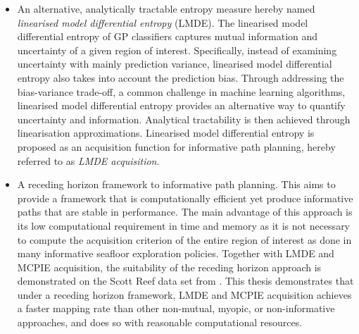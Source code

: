 \begin{itemize}
			\item An alternative, analytically tractable entropy measure hereby named \textit{linearised model differential entropy} (LMDE). The linearised model differential entropy of GP classifiers captures mutual information and uncertainty of a given region of interest. Specifically, instead of examining uncertainty with mainly prediction variance, linearised model differential entropy also takes into account the prediction bias. Through addressing the bias-variance trade-off, a common challenge in machine learning algorithms, linearised model differential entropy provides an alternative way to quantify uncertainty and information. Analytical tractability is then achieved through linearisation approximations. Linearised model differential entropy is proposed as an acquisition function for informative path planning, hereby referred to as \textit{LMDE acquisition}.
			
			\item A receding horizon framework to informative path planning. This aims to provide a framework that is computationally efficient yet produce informative paths that are stable in performance. The main advantage of this approach is its low computational requirement in time and memory as it is not necessary to compute the acquisition criterion of the entire region of interest as done in many informative seafloor exploration policies. Together with LMDE and MCPIE acquisition, the suitability of the receding horizon approach is demonstrated on the Scott Reef data set from \cite{IMOS}. This thesis demonstrates that under a receding horizon framework, LMDE and MCPIE acquisition achieves a faster mapping rate than other non-mutual, myopic, or non-informative approaches, and does so with reasonable computational resources. 
			
		\end{itemize}
		
%	
%		
%		
%			
%			
%			
%		
%			
			
